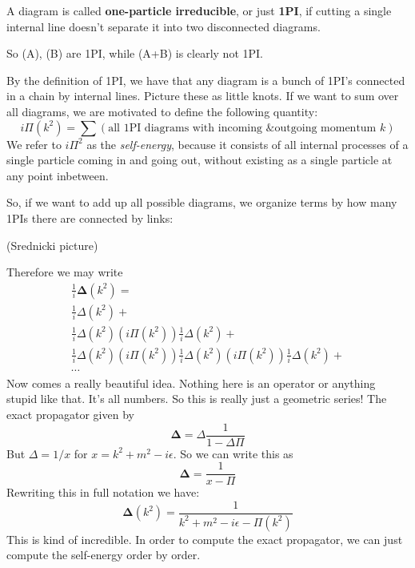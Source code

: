 \documentclass[main.tex]{subfiles}
\begin{document}
\begin{defn}
A diagram is called \textbf{one-particle irreducible}, or just \textbf{1PI}, if cutting a single internal line doesn't separate it into two disconnected diagrams.
\end{defn}
So (A), (B) are 1PI, while (A+B) is clearly not 1PI. 

By the definition of 1PI, we have that any diagram is a bunch of 1PI's connected in a chain by internal lines. Picture these as little knots. If we want to sum over all diagrams, we are motivated to define the following quantity:
\[
i\Pi(k^2) = \sum(\text{all 1PI diagrams with incoming \& outgoing momentum $k$})
\]
We refer to $i\Pi^2$ as the \textit{self-energy}, because it consists of all internal processes of a single particle coming in and going out, without existing as a single particle at any point inbetween.

So, if we want to add up all possible diagrams, we organize terms by how many 1PIs there are connected by links:

(Srednicki picture)

Therefore we may write
\begin{align}
&\frac{1}{i} \mathbf{\Delta} (k^2) = &\\ & \frac{1}{i}\Delta(k^2) +& \\ 
&\frac{1}{i}\Delta(k^2) (i \Pi(k^2)) \frac{1}{i}\Delta(k^2) + & \\ 
&\frac{1}{i}\Delta(k^2) (i\Pi(k^2)) \frac{1}{i}\Delta(k^2)  (i \Pi(k^2)) \frac{1}{i}\Delta(k^2) + & \\
&\cdots &
\end{align}
Now comes a really beautiful idea. Nothing here is an operator or anything stupid like that. It's all numbers. So this is really just a geometric series! The exact propagator  given by
\[
\mathbf{\Delta} = \Delta \frac{1}{1-\Delta\Pi}
\]
But $\Delta = 1/x$ for $x = k^2 + m^2 - i\epsilon$. So we can write this as 
\[
\mathbf{\Delta} = \frac{1}{x - \Pi}
\]
Rewriting this in full notation we have:
\begin{equation} \label{eq:wowgeo}
\mathbf{\Delta} (k^2) = \frac{1}{k^2 + m^2 - i\epsilon - \Pi(k^2)}
\end{equation}
This is kind of incredible. In order to compute the exact propagator, we can just compute the self-energy order by order.
\end{document}
